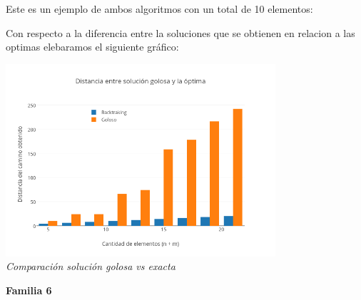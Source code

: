 Este es un ejemplo de ambos algoritmos con un total de 10 elementos:

\begin{figure} [!ht]
 \centering
       \label{fig:fam5exacto}
    \label{fig:fam5goloso}
    \end{figure}
    
Con respecto a la diferencia entre la soluciones que se obtienen en relacion a las optimas elebaramos el siguiente gráfico:\\
 
\vspace*{0.3cm} \vspace*{0.3cm}
  \begin{center}
 \includegraphics[width=0.75\textwidth]{./EJ2/gym0Dif.png}
\\{\textit{Comparación solución golosa vs exacta}}
\end{center}
\begin{center}
\textbf{Familia 6}
\end{center}

